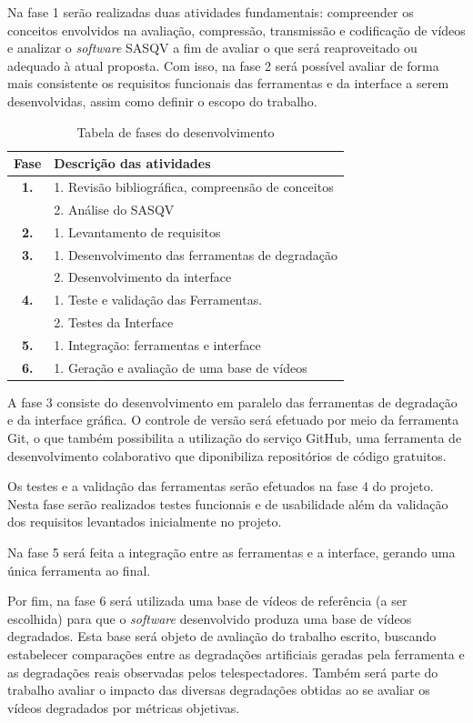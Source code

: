 Na fase 1 serão realizadas duas atividades fundamentais: compreender os conceitos envolvidos na avaliação, compressão, transmissão e codificação de vídeos e analizar o \emph{software}
SASQV a fim de avaliar o que será reaproveitado ou adequado à atual proposta. Com isso, na fase 2 será possível avaliar de forma mais consistente os requisitos funcionais das ferramentas 
e da interface a serem desenvolvidas, assim como definir o escopo do trabalho.

\begin{table}[htb]
	\centering
	\caption{Tabela de fases do desenvolvimento}
	\label{tab:metodologia}
	\begin{tabular}{c|l}
	\hline
	\textbf{Fase} & \textbf{Descrição das atividades} \\
	\hline
	\textbf{1.} & 1. Revisão bibliográfica, compreensão de conceitos \\
		& 2. Análise do SASQV \\
	\textbf{2.} & 1. Levantamento de requisitos \\
	\textbf{3.} & 1. Desenvolvimento das ferramentas de degradação \\
		& 2. Desenvolvimento da interface \\
	\textbf{4.} & 1. Teste e validação das Ferramentas. \\
		& 2. Testes da Interface \\
	\textbf{5.} & 1. Integração: ferramentas e interface \\
	\textbf{6.} & 1. Geração e avaliação de uma base de vídeos \\
	\hline
	\end{tabular}
\end{table}

A fase 3 consiste do desenvolvimento em paralelo das ferramentas de degradação e da interface gráfica. O controle de versão será efetuado por meio da ferramenta Git, o que também possibilita a utilização do serviço GitHub, uma ferramenta de desenvolvimento colaborativo que diponibiliza repositórios de código gratuitos.

Os testes e a validação das ferramentas serão efetuados na fase 4 do projeto. Nesta fase serão realizados testes funcionais e de usabilidade além da validação dos requisitos levantados inicialmente no projeto.

Na fase 5 será feita a integração entre as ferramentas e a interface, gerando uma única ferramenta ao final.

Por fim, na fase 6 será utilizada uma base de vídeos de referência (a ser escolhida) para que o \emph{software} desenvolvido produza uma base de vídeos degradados. 
Esta base será objeto de avaliação do trabalho escrito, buscando estabelecer comparações entre as degradações artificiais geradas pela ferramenta e as degradações reais observadas pelos telespectadores.
Também será parte do trabalho avaliar o impacto das diversas degradações obtidas ao se avaliar os vídeos degradados por métricas objetivas.


